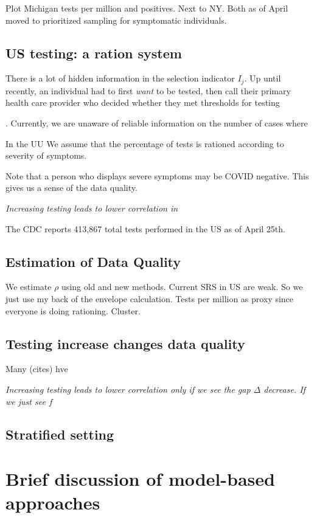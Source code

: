 \documentclass[11pt]{article}
\numberwithin{equation}{section}
\theoremstyle{plain}
\begin{document}
Plot Michigan tests per million and positives.  Next to NY.  Both as of April moved to prioritized sampling for symptomatic individuals.

\subsection{US testing: a ration system}

There is a lot of hidden information in the selection indicator $I_j$.  Up until recently, an individual had to first \emph{want} to be tested, then call their primary health care provider who decided whether they met thresholds for testing

. Currently, we are unaware of reliable information on the number of cases where

In the UU
We assume that the percentage of tests is rationed according to severity of symptoms.

Note that a person who displays severe symptoms may be COVID negative.  This gives us a sense of the data quality.

\emph{Increasing testing leads to lower correlation in}

The CDC reports 413,867 total tests performed in the US as of April 25th.

\subsection{Estimation of Data Quality}

We estimate $\rho$ using old and new methods.  Current SRS in US are weak.  So we just use my back of the envelope calculation. Tests per million as proxy since everyone is doing rationing. Cluster.
\subsection{Testing increase changes data quality}

Many (cites) hve

\emph{Increasing testing leads to lower correlation only if we see the gap $\Delta$ decrease.  If we just see $f$ }

\subsection{Stratified setting}


\section{Brief discussion of model-based approaches}
\end{document}
